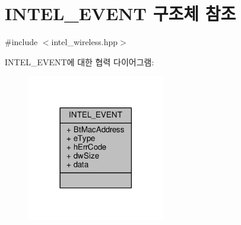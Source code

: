 \hypertarget{struct_i_n_t_e_l___e_v_e_n_t}{}\section{I\+N\+T\+E\+L\+\_\+\+E\+V\+E\+NT 구조체 참조}
\label{struct_i_n_t_e_l___e_v_e_n_t}


{\ttfamily \#include $<$intel\+\_\+wireless.\+hpp$>$}



I\+N\+T\+E\+L\+\_\+\+E\+V\+E\+N\+T에 대한 협력 다이어그램\+:
\nopagebreak
\begin{figure}[H]
\begin{center}
\leavevmode
\includegraphics[width=170pt]{struct_i_n_t_e_l___e_v_e_n_t__coll__graph}
\end{center}
\end{figure}
